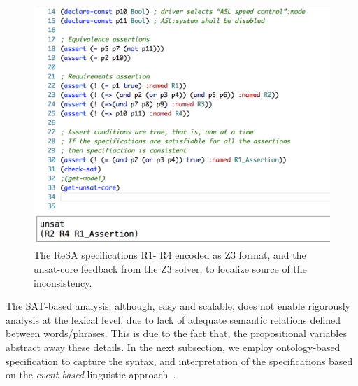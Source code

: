\begin{figure}[h]
	\centering
	\includegraphics[width=0.7\linewidth]{images/z3}
	\caption{The ReSA specifications R1- R4 encoded as Z3 format, and the unsat-core feedback from the Z3 solver, to localize source of the inconsistency.}
	\label{fig_z3}
\end{figure}

The SAT-based analysis, although, easy and scalable, does not enable rigorously analysis at the lexical level, due to lack of adequate semantic relations defined between words/phrases. This is due to the fact that, the propositional variables abstract away these details. In the next subsection, we employ ontology-based specification to capture the syntax, and interpretation of the specifications based on the \textit{event-based} linguistic approach~\cite{Mahmud2017SpecificationLogic}.

